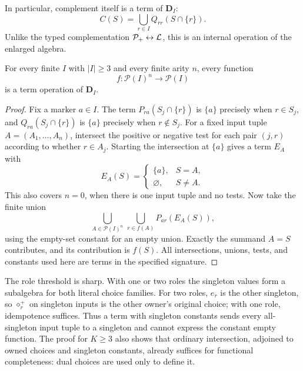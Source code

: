 In particular, complement itself is a term of $\mathbf D_I$:
\begin{equation}\label{dual:eq:term-complement}
 C(S)=\bigcup_{r\in I}Q_{rr}(S\cap\{r\}).
\end{equation}
Unlike the typed complementation $\mathcal P_+\leftrightarrow\mathcal L$,
this is an internal operation of the enlarged algebra.

\begin{theorem}\label{dual:thm:complete}
For every finite $I$ with $|I|\geq3$ and every finite arity $n$,
every function
\[
 f:\mathcal P(I)^n\longrightarrow\mathcal P(I)
\]
is a term operation of $\mathbf D_I$.
\end{theorem}
\begin{proof}
Fix a marker $a\in I$. The term
$P_{ra}(S_j\cap\{r\})$ is $\{a\}$ precisely when
$r\in S_j$, and $Q_{ra}(S_j\cap\{r\})$ is $\{a\}$
precisely when $r\notin S_j$. For a fixed input tuple
$A=(A_1,\ldots,A_n)$, intersect the positive or negative test for
each pair $(j,r)$ according to whether $r\in A_j$. Starting the
intersection at $\{a\}$ gives a term $E_A$ with
\[
 E_A(S)=\begin{cases}\{a\},&S=A,\\
 \varnothing,&S\ne A.\end{cases}
\]
This also covers $n=0$, when there is one input tuple and no tests.
Now take the finite union
\begin{equation}\label{dual:eq:truth-table}
 \bigcup_{A\in\mathcal P(I)^n}\,
 \bigcup_{r\in f(A)} P_{ar}(E_A(S)),
\end{equation}
using the empty-set constant for an empty union. Exactly the summand
$A=S$ contributes, and its contribution is $f(S)$.
All intersections, unions, tests, and constants used here are terms
in the specified signature.
\end{proof}

The role threshold is sharp. With one or two roles the singleton values
form a subalgebra for both literal choice families. For two roles,
$e_r$ is the other singleton, so $\diamond_r^+$ on singleton inputs
is the other owner's original choice; with one role, idempotence
suffices. Thus a term with singleton constants sends every all-singleton
input tuple to a singleton and cannot express the constant empty
function. The proof for $K\geq3$ also shows that ordinary intersection,
adjoined to owned choices and singleton constants, already suffices for
functional completeness: dual choices are used only to define it.

